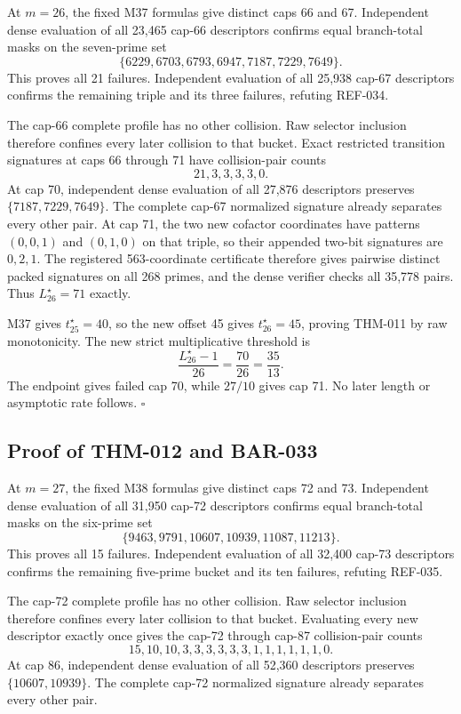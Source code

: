 \documentclass[11pt]{article}
\begin{document}
At \(m=26\), the fixed M37 formulas give distinct caps 66 and 67.
Independent dense evaluation of all 23,465 cap-66 descriptors confirms equal
branch-total masks on the seven-prime set
\[
\{6229,6703,6793,6947,7187,7229,7649\}.
\]
This proves all 21 failures. Independent evaluation of all 25,938 cap-67
descriptors confirms the remaining triple and its three failures, refuting
REF-034.

The cap-66 complete profile has no other collision. Raw selector inclusion
therefore confines every later collision to that bucket. Exact restricted
transition signatures at caps 66 through 71 have collision-pair counts
\[
21,3,3,3,3,0.
\]
At cap 70, independent dense evaluation of all 27,876 descriptors preserves
\(\{7187,7229,7649\}\). The complete cap-67 normalized signature already
separates every other pair. At cap 71, the two new cofactor coordinates have
patterns \((0,0,1)\) and \((0,1,0)\) on that triple, so their appended
two-bit signatures are \(0,2,1\). The registered 563-coordinate certificate
therefore gives pairwise distinct packed signatures on all 268 primes, and
the dense verifier checks all 35,778 pairs. Thus \(L_{26}^\star=71\)
exactly.

M37 gives \(t_{25}^\star=40\), so the new offset 45 gives
\(t_{26}^\star=45\), proving THM-011 by raw monotonicity. The new strict
multiplicative threshold is
\[
\frac{L_{26}^\star-1}{26}=\frac{70}{26}=\frac{35}{13}.
\]
The endpoint gives failed cap 70, while \(27/10\) gives cap 71. No later
length or asymptotic rate follows. \(\square\)

\subsection{Proof of THM-012 and BAR-033}
\label{proof:THM-012-BAR-033}

At \(m=27\), the fixed M38 formulas give distinct caps 72 and 73.
Independent dense evaluation of all 31,950 cap-72 descriptors confirms equal
branch-total masks on the six-prime set
\[
\{9463,9791,10607,10939,11087,11213\}.
\]
This proves all 15 failures. Independent evaluation of all 32,400 cap-73
descriptors confirms the remaining five-prime bucket and its ten failures,
refuting REF-035.

The cap-72 complete profile has no other collision. Raw selector inclusion
therefore confines every later collision to that bucket. Evaluating every
new descriptor exactly once gives the cap-72 through cap-87 collision-pair
counts
\[
15,10,10,3,3,3,3,3,3,1,1,1,1,1,1,0.
\]
At cap 86, independent dense evaluation of all 52,360 descriptors preserves
\(\{10607,10939\}\). The complete cap-72 normalized signature already
separates every other pair.
\end{document}
